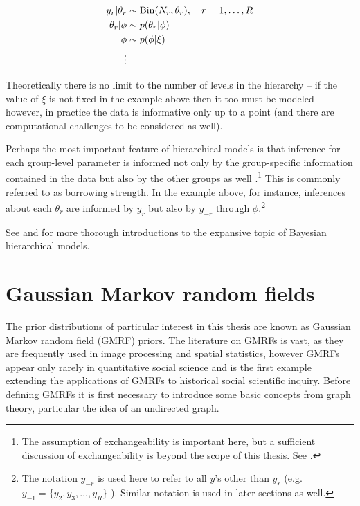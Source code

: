 \begin{align*}
y_r | \theta_r &\sim {\rm Bin}(N_r, \theta_r), \quad r = 1, \dots, R \\
\theta_r  | \phi &\sim p(\theta_r | \phi) \\
\phi & \sim p(\phi | \xi)  \\
\vdots
\end{align*}

Theoretically there is no limit to the number of levels in the hierarchy -- if the value of $\xi$ is not fixed in the example above then it too must be modeled -- however, in practice the data is informative only up to a point (and there are computational challenges to be considered as well). 

Perhaps the most important feature of hierarchical models is that inference for each group-level parameter is informed not only by the group-specific information contained in the data but also by the other groups as well .\footnote{The assumption of exchangeability is important here, but a sufficient discussion of exchangeability is beyond the scope of this thesis. See .} This is commonly referred to as borrowing strength. In the example above, for instance, inferences about each $\theta_r$ are informed by $y_r$ but also by $y_{-r}$ through $\phi$.\footnote{The notation $y_{-r}$ is used here to refer to all $y$'s other than $y_r$ (e.g. $y_{-1} =  \{y_2, y_3, \dots, y_R\}$ ). Similar notation is used in later sections as well. } 

See  and  for more thorough introductions to the expansive topic of Bayesian hierarchical models.  




\section{Gaussian Markov random fields}
\label{gmrf}

The prior distributions of particular interest in this thesis are known as Gaussian Markov random field (GMRF) priors. The literature on GMRFs is vast, as they are frequently used in image processing and spatial statistics, however  GMRFs appear only rarely in quantitative social science and  is the first example extending the applications of GMRFs to historical social scientific inquiry. Before defining GMRFs it is first necessary to introduce some basic concepts from graph theory, particular the idea of an undirected graph. 

